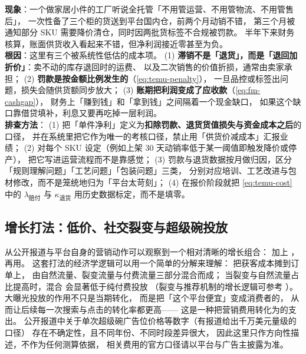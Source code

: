 \begin{pitfall}
\textbf{现象}：一个做家居小件的工厂听说全托管「不用管运营、不用管物流、不用管售后」，
一次性备了三个柜的货送到平台国内仓，前两个月动销不错，
第三个月被通知部分 SKU 需要降价清仓，同时因两批货标签不合规被罚款。
半年下来财务核算，账面供货收入看起来不错，但净利润接近零甚至为负。\\
\textbf{根因}：这里有三个被系统性低估的成本项。
(1) \textbf{滞销不是「退货」，而是「退回加折价」}：卖不动的库存退回时的运费、
以及二次销售的价值折损，通常由卖家承担；
(2) \textbf{罚款是按金额比例发生的}（\cref{eq:temu-penalty}），
一旦品控或标签出问题，损失会随供货额同步放大；
(3) \textbf{账期把利润变成了应收款}（\cref{eq:fm-cashgap}），
财务上「赚到钱」和「拿到钱」之间隔着一个现金缺口，
如果这个缺口靠借贷填补，利息又要再吃掉一层利润。\\
\textbf{排查方法}：
(1) 把「单件净利」定义为\textbf{扣除罚款、退货货值损失与资金成本之后}的口径，
并在系统里把它作为唯一的考核口径，禁止用「供货价减成本」汇报业绩；
(2) 对每个 SKU 设定（例如上架 30 天动销率低于某一阈值即触发降价或停产），
把它写进运营流程而不是靠感觉；
(3) 罚款与退货数据按月做归因，区分「规则理解问题」「工艺问题」「包装问题」三类，
分别对应培训、工艺改进与包材修改，而不是笼统地归为「平台太苛刻」；
(4) 在报价阶段就把 \cref{eq:temu-cost} 中的 $\lambda_{\text{赔付}}$ 与
$\kappa_{\text{退货}}$ 用历史数据标定，而不是填零。
\end{pitfall}

\subsection{增长打法：低价、社交裂变与超级碗投放}

从公开报道与平台自身的营销动作可以观察到一个相对清晰的增长组合：
 加上 ，
再用。
这套打法的经济学逻辑可以用一个简单的分解来理解：
把获客成本摊到订单上， 由自然流量、裂变流量与付费流量三部分混合而成；
当裂变与自然流量占比提高时，混合  会显著低于纯付费投放
（裂变与推荐机制的增长逻辑可参考 \cite{ellis2021growth,ries2011lean}）。
大曝光投放的作用不只是当期转化，
而是把「这个平台便宜」变成消费者的，
从而让后续每一次搜索与点击的转化率都更高——
这是一种把营销费用转化为的支出。
公开报道中关于单次超级碗广告位价格等数字（有报道给出千万美元量级的口径）
存在不确定性，且不同年份、不同时段差异很大，
因此这里只作方向性描述，不作为任何测算依据，
相关费用的官方口径请以平台与广告主披露为准。

